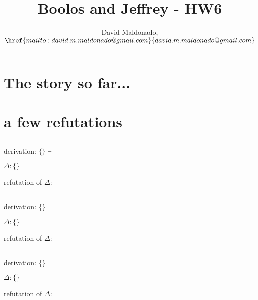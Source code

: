 \documentclass[a4paper,11pt]{article}
\author{David Maldonado, $\href{mailto:david.m.maldonado@gmail.com}%
{david.m.maldonado@gmail.com}$}
\title{Boolos and Jeffrey - HW6}
\begin{document}
\maketitle


\section{The story so far...}

\section{a few refutations}


\subsection{}

derivation: $ \{ \} \vdash $

\bigskip

\noindent $\Delta: \{ \}$

\bigskip

\noindent refutation of $\Delta:$


\subsection{}

derivation: $\{ \} \vdash $

\bigskip

\noindent $\Delta: \{ \}$

\bigskip

\noindent refutation of $\Delta:$


\subsection{}

derivation: $\{ \} \vdash $

\bigskip

\noindent $\Delta: \{ \} $

\bigskip

\noindent refutation of $\Delta:$
\end{document}
